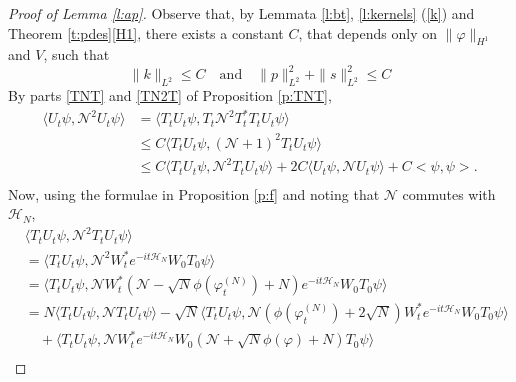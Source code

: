 \documentclass[11pt,a4paper,draft,DIV11]{scrartcl}	%
\newcommand{\N}{\mathcal{N}}
\newcommand{\scal}[2]{\big<#1,#2\big>} %
\newcommand{\ph}{\varphi_t^{(N)}}	%
\begin{document}
\begin{proof}[Proof of Lemma \ref{l:ap}]
  Observe that, by Lemmata \ref{l:bt}, \ref{l:kernels} (\ref{k}) and Theorem
  \ref{t:pdes}\eqref{H1}, there exists a constant $C$, %
  that depends only on $\| \varphi \|_{H^1}$ and $V$, such that
  \begin{equation} \label{c2}
      \| k \|_{L^2} \le C %
\quad\text{and}\quad
      \| p \|_{L^2}^2 + \| s \|_{L^2}^2 \le C%
  \end{equation}
  By parts \eqref{TNT} and \eqref{TN2T} of Proposition \ref{p:TNT},
  \begin{equation}
    \label{ep4}
    \begin{split}
      \langle U_t \psi, \N^2 U_t \psi \rangle & = \langle T_t U_t \psi, T_t
      \N^2 T_t^* T_t U_t \psi \rangle \\
      & \le C \langle T_t U_t \psi, (\N+1)^2 T_t U_t \psi \rangle \\
      & \le C \langle T_t U_t \psi, \N^2 T_t U_t \psi \rangle + 2 C \langle
      U_t \psi, \N U_t \psi \rangle + C\scal{\psi}{\psi}. \\
    \end{split}
  \end{equation} 
  Now, using the formulae in Proposition \ref{p:f} and noting that $\N$
  commutes with $\mathcal{H}_N$,
  \begin{align*}
    & \langle T_t U_t \psi, \N^2 T_t U_t \psi \rangle \\
    & = \langle T_t U_t \psi, \N^2 W_t^* e^{-it \mathcal{H}_N} W_0 T_0 \psi \rangle
    \\
    & = \langle T_t U_t \psi, \N W_t^* \left(\N - \sqrt{N} \phi(\ph) + N\right)
    e^{-it \mathcal{H}_N} W_0 T_0 \psi \rangle \\
    & = N \langle T_t U_t \psi, \N T_t U_t \psi \rangle - \sqrt{N} \langle T_t
    U_t \psi, \N \left( \phi(\ph) + 2\sqrt{N}\right) W_t^* e^{-it\mathcal{H}_N} W_0 T_0 
    \psi \rangle \\
    & \quad + \langle T_t U_t \psi, \N W_t^* e^{-it\mathcal{H}_N} W_0 \left(\N +
    \sqrt{N} \phi(\varphi) + N\right) T_0 \psi \rangle \\

\end{align*}
\end{proof}
\end{document}

